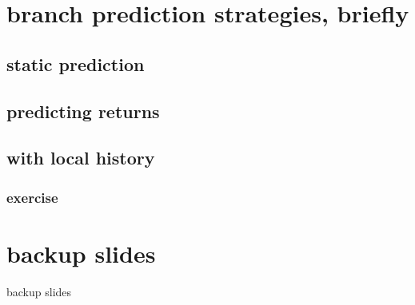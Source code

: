 

\section{branch prediction strategies, briefly}

\subsection{static prediction}


\subsection{predicting returns}


\subsection{with local history}


\subsubsection{exercise}


\section{backup slides}
\begin{frame}{backup slides}
\end{frame}
